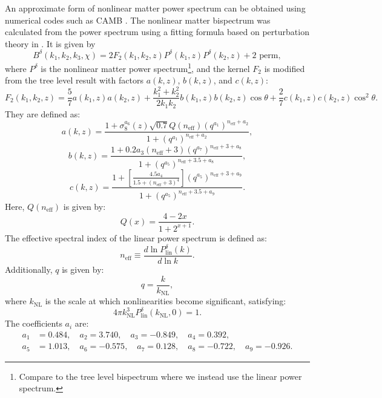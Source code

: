 \documentclass[11pt]{article} %
\begin{document}
An approximate form of nonlinear matter power spectrum can be obtained using numerical codes such as CAMB \cite{Lewis2000}. The nonlinear matter bispectrum was calculated from the power spectrum using a fitting formula based on perturbation theory in \cite{bispfit}. It is given by
\begin{equation}
    B^\delta(k_1, k_2, k_3, \chi) = 2 F_2(k_1, k_2, z) P^\delta(k_1, z) P^\delta(k_2, z) + \text{2 perm}, \label{eq:matterbispectrum}
\end{equation}
where \( P^\delta \) is the nonlinear matter power spectrum\footnote{Compare to the tree level bispectrum where we instead use the linear power spectrum.}, and the kernel \( F_2 \) is modified from the tree level result with factors \( a(k, z) \), \( b(k, z) \), and \( c(k, z) \):
\begin{equation}
    F_2(k_1, k_2, z) = \frac{5}{7} a(k_1, z) a(k_2, z) + \frac{k_1^2 + k_2^2}{2 k_1 k_2} b(k_1, z) b(k_2, z) \cos \theta + \frac{2}{7} c(k_1, z) c(k_2, z) \cos^2 \theta.
\end{equation}
They are defined as:
\begin{equation}
    a(k, z) = \frac{1 + \sigma_8^{a_6}(z) \sqrt{0.7} Q(n_{\text{eff}}) (q^{a_1})^{n_{\text{eff}} + a_2}}{1 + (q^{a_1})^{n_{\text{eff}} + a_2}},
\end{equation}
\begin{equation}
    b(k, z) = \frac{1 + 0.2 a_3 (n_{\text{eff}} + 3) (q^{a_7})^{n_{\text{eff}} + 3 + a_8}}{1 + (q^{a_5})^{n_{\text{eff}} + 3.5 + a_8}},
\end{equation}
\begin{equation}
    c(k, z) = \frac{1 + \left[ \frac{4.5 a_4}{1.5 + (n_{\text{eff}} + 3)^4} \right] (q^{a_5})^{n_{\text{eff}} + 3 + a_9}}{1 + (q^{a_5})^{n_{\text{eff}} + 3.5 + a_9}}.
\end{equation}
Here, \( Q(n_{\text{eff}}) \) is given by:
\begin{equation}
    Q(x) = \frac{4 - 2x}{1 + 2^{x+1}}.
\end{equation}
The effective spectral index of the linear power spectrum is defined as:
\begin{equation}
    n_{\text{eff}} \equiv \frac{d \ln P^\delta_{\text{lin}}(k)}{d \ln k}.
\end{equation}
Additionally, \( q \) is given by:
\begin{equation}
    q = \frac{k}{k_{\text{NL}}},
\end{equation}
where \( k_{\text{NL}} \) is the scale at which nonlinearities become significant, satisfying:
\begin{equation}
    4 \pi k_{\text{NL}}^3 P^\delta_{\text{lin}}(k_{\text{NL}}, 0) = 1.
\end{equation}
The coefficients \( a_i \) are:
\begin{align*}
    a_1 &= 0.484, \quad a_2 = 3.740, \quad a_3 = -0.849, \quad a_4 = 0.392, \\
    a_5 &= 1.013, \quad a_6 = -0.575, \quad a_7 = 0.128, \quad a_8 = -0.722, \quad a_9 = -0.926.
\end{align*}
\end{document}
